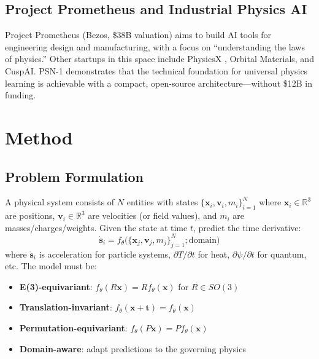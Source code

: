 \documentclass[11pt,a4paper]{article}
\begin{document}
\subsection{Project Prometheus and Industrial Physics AI}

Project Prometheus \cite{cnbc2026prometheus,builtin2025prometheus,nytimes2025prometheus} (Bezos, \$38B valuation) aims to build AI tools for engineering design and manufacturing, with a focus on ``understanding the laws of physics.'' Other startups in this space include PhysicsX \cite{physicsx2024}, Orbital Materials, and CuspAI. PSN-1 demonstrates that the technical foundation for universal physics learning is achievable with a compact, open-source architecture---without \$12B in funding.

\section{Method}

\subsection{Problem Formulation}

A physical system consists of $N$ entities with states $\{\mathbf{x}_i, \mathbf{v}_i, m_i\}_{i=1}^N$ where $\mathbf{x}_i \in \mathbb{R}^3$ are positions, $\mathbf{v}_i \in \mathbb{R}^3$ are velocities (or field values), and $m_i$ are masses/charges/weights. Given the state at time $t$, predict the time derivative:
\begin{equation}
    \dot{\mathbf{s}}_i = f_\theta\big(\{\mathbf{x}_j, \mathbf{v}_j, m_j\}_{j=1}^N; \text{domain}\big)
\end{equation}
where $\dot{\mathbf{s}}_i$ is acceleration for particle systems, $\partial T/\partial t$ for heat, $\partial\psi/\partial t$ for quantum, etc. The model must be:
\begin{itemize}[leftmargin=*]
    \item \textbf{E(3)-equivariant}: $f_\theta(R\mathbf{x}) = R f_\theta(\mathbf{x})$ for $R \in SO(3)$
    \item \textbf{Translation-invariant}: $f_\theta(\mathbf{x} + \mathbf{t}) = f_\theta(\mathbf{x})$
    \item \textbf{Permutation-equivariant}: $f_\theta(P\mathbf{x}) = P f_\theta(\mathbf{x})$
    \item \textbf{Domain-aware}: adapt predictions to the governing physics
\end{itemize}
\end{document}
